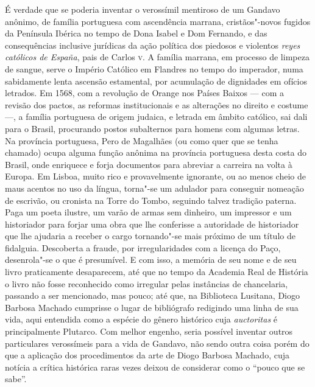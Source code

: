 É verdade que se poderia inventar o verossímil mentiroso de um Gandavo
anônimo, de família portuguesa com ascendência marrana, cristãos"-novos
fugidos da Península Ibérica no tempo de Dona Isabel e Dom Fernando, e
das consequências inclusive jurídicas da ação política dos piedosos e
violentos \textit{reyes católicos de España}, pais de Carlos \textsc{v}. A família
marrana, em processo de limpeza de sangue, serve o Império Católico em
Flandres no tempo do imperador, numa sabidamente lenta ascensão
estamental, por acumulação de dignidades em ofícios letrados. Em 1568,
com a revolução de Orange nos Países Baixos --- com a revisão dos pactos,
as reformas institucionais e as alterações no direito e costume ---, a
família portuguesa de origem judaica, e letrada em âmbito católico, sai
dali para o Brasil, procurando postos subalternos para homens com
algumas letras. Na província portuguesa, Pero de Magalhães (ou como
quer que se tenha chamado) ocupa alguma função anônima na província
portuguesa desta costa do Brasil, onde enriquece e forja documentos
para abreviar a carreira na volta à Europa. Em Lisboa, muito rico e
provavelmente ignorante, ou ao menos cheio de maus acentos no uso da
língua, torna"-se um adulador para conseguir nomeação de escrivão, ou
cronista na Torre do Tombo, seguindo talvez tradição paterna. Paga um
poeta ilustre, um varão de armas sem dinheiro, um impressor e um
historiador para forjar uma obra que lhe conferisse a autoridade de
historiador que lhe ajudaria a receber o cargo tornando"-se mais próximo
de um título de fidalguia. Descoberta a fraude, por irregularidades com
a licença do Paço, desenrola"-se o que é presumível. E com isso, a
memória de seu nome e de seu livro praticamente desaparecem, até que no
tempo da Academia Real de História o livro não fosse reconhecido como
irregular pelas instâncias de chancelaria, passando a ser mencionado,
mas pouco; até que, na Biblioteca  Lusitana, Diogo Barbosa Machado
cumprisse o lugar de bibliógrafo redigindo uma linha de sua vida, aqui
entendida como a espécie do gênero histórico cuja \textit{auctoritas} é
principalmente Plutarco. Com melhor engenho, seria possível inventar
outros particulares verossímeis para a vida de Gandavo, não sendo outra
coisa porém do que a aplicação dos procedimentos da arte de Diogo
Barbosa Machado, cuja notícia a crítica histórica raras vezes deixou de
considerar como o ``pouco que se sabe''.


